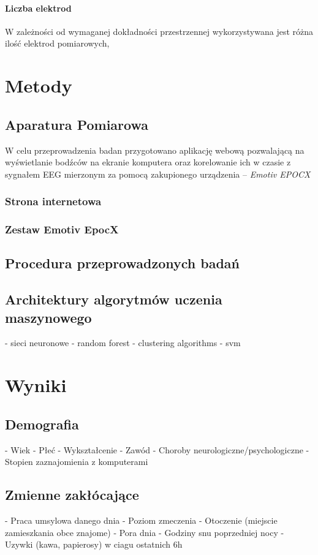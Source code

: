 \documentclass{./assets/wfis}
\begin{document}
\subsubsection{Liczba elektrod}

W zależności od wymaganej dokładności przestrzennej wykorzystywana jest różna ilość elektrod pomiarowych,

\chapter{Metody}


\section{Aparatura Pomiarowa}\label{aparatura-pomiarowa}
 W celu przeprowadzenia badan przygotowano aplikację webową pozwalającą na wyświetlanie bodźców na ekranie komputera oraz korelowanie ich w czasie z sygnałem EEG mierzonym za pomocą zakupionego urządzenia – \textit{Emotiv EPOCX}

\subsection{Strona internetowa}
\subsection{Zestaw Emotiv EpocX}\label{emotiv}

\section{Procedura przeprowadzonych badań}\label{procedura-badan}
\section{Architektury algorytmów uczenia maszynowego}
- sieci neuronowe
- random forest
- clustering algorithms
- svm

\chapter{Wyniki}
\section{Demografia}
- Wiek
- Płeć
- Wykształcenie
- Zawód
- Choroby neurologiczne/psychologiczne
- Stopien zaznajomienia z komputerami
\section{Zmienne zakłócające}\label{zmiennne-zaklucajace}
- Praca umsylowa danego dnia
- Poziom zmeczenia
- Otoczenie (miejscie zamieszkania obce znajome)
- Pora dnia
- Godziny snu poprzedniej nocy
- Uzywki (kawa, papierosy) w ciagu ostatnich 6h
\end{document}
